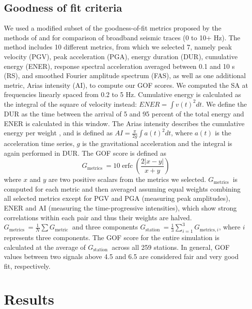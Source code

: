 \subsection{Goodness of fit criteria}
We used a modified subset of the goodness-of-fit metrics proposed by the methods of \citet{andersonQuantitativeMeasureGoodnessOfFit2004} and \citet{olsenGoodnessoffitCriteriaBroadband2010}for comparison of broadband seismic traces (0 to 10+ Hz). The method includes 10 different metrics, from which we selected 7, namely peak velocity (PGV), peak acceleration (PGA), energy duration (DUR), cumulative energy (ENER), response spectral acceleration averaged between 0.1 and 10 s (RS), and smoothed Fourier amplitude spectrum (FAS), as well as one additional metric, Arias intensity (AI), to compute our GOF scores. We computed the SA at frequencies linearly spaced from 0.2 to 5 Hz. Cumulative energy is calculated as the integral of the square of velocity instead: $E N E R=\int v(t)^{2} d t$. We define the DUR as the time between the arrival of 5 and 95 percent of the total energy and ENER is calculated in this window. The Arias intensity describes the cumulative energy per weight \citep{arias1970measure}, and is defined as $AI=\frac{\pi}{2 g} \int a(t)^{2} d t$, where $a(t)$ is the acceleration time series, $g$ is the gravitational acceleration and the integral is again performed in DUR. The GOF score is defined as
\begin{equation}\label{qe:highf-4}
  G_{\text {metrics }}=10 \operatorname{erfc}\left(\frac{2|x-y|}{x+y}\right)
\end{equation}
\noindent where $x$ and $y$ are two positive scalars from the metrics we selected. $G_{\text {metrics }}$ is computed for each metric and then averaged assuming equal weights combining all selected metrics except for PGV and PGA (measuring peak amplitudes), ENER and AI (measuring the time-progressive intensities), which show strong correlations within each pair and thus their weights are halved. $G_{\text {metrics }}=\frac{1}{N} \sum G_{\text {metric }}$ and three components $G_{\text {station }}=\frac{1}{3} \sum_{i=1}^3 G_{\text {metrics}, i}$, where $i$ represents three components. The GOF score for the entire simulation is calculated at the average of $G_{\text {station }}$ across all 259 stations. In general, GOF values between two signals above 4.5 and 6.5 are considered fair and very good fit, respectively.

\section{Results}
